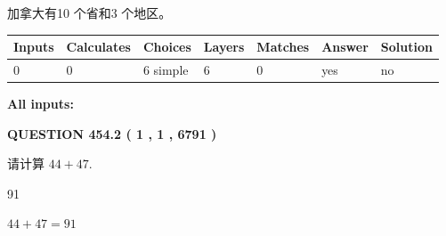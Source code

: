 \documentclass{ctexart}
\begin{document}
 
加拿大有10 个省和3 个地区。
 
 
\noindent{}
 
 
   
   
   
   
\noindent\begin{tabular}{|l|l|l|l|l|l|l|}
 \hline
Inputs & Calculates & Choices & Layers & Matches & Answer & Solution \\ \hline
 0  & 
 0  & 
 6
  simple  
  & 
 6  & 
 0  & 
  yes & 
  no 
  \\ \hline
 \end{tabular}
   
   
   
   
\noindent{}
   
   
   
   
\noindent\vspace{0.1in}\hspace{-0.08in} {\textbf{\Large{All inputs: }}}
   
   
  
\vspace{0.2in}
  
{\textbf{\Large{QUESTION
454.2 
 ( 1 , 1 , 6791 )
}}}
  
  
 
请计算 $ %
44 +  %
47 $.
 
 
 
\noindent{}
 
 

91
 
 
\noindent{}
 
 

 
 
 
\noindent{}
 
 

$ %
44 +  %
47=   %
91$
 
 
\noindent{}
 
 

 
   
   
   
\end{document}
